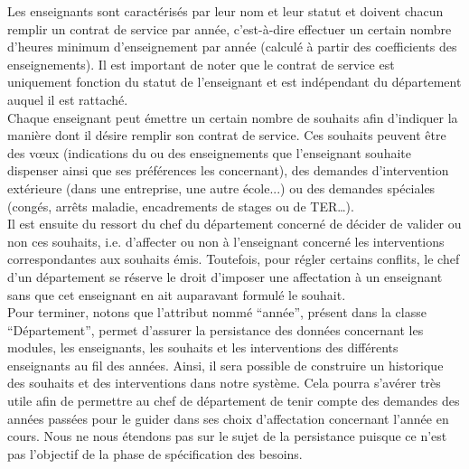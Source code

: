  Les enseignants sont caractérisés par leur nom et leur statut et doivent chacun remplir un contrat de service par année, c'est-à-dire effectuer un certain nombre d'heures minimum d'enseignement par année (calculé à partir des coefficients des enseignements). Il est important de noter que le contrat de service est uniquement fonction du statut de l'enseignant et est indépendant du département auquel il est rattaché.\\

 Chaque enseignant peut émettre un certain nombre de souhaits afin d'indiquer la manière dont il désire remplir son contrat de service. Ces souhaits peuvent être des v\oe ux (indications du ou des enseignements que l'enseignant souhaite dispenser ainsi que ses préférences les concernant), des demandes d'intervention extérieure (dans une entreprise, une autre école...) ou des demandes spéciales (congés, arrêts maladie, encadrements de stages ou de TER\dots).\\ 

 Il est ensuite du ressort du chef du département concerné de décider de valider ou non ces souhaits, i.e. d'affecter ou non à l'enseignant concerné les interventions correspondantes aux souhaits émis. Toutefois, pour régler certains conflits, le chef d'un département se réserve le droit d'imposer une affectation à un enseignant sans que cet enseignant en ait auparavant formulé le souhait.\\ 

 Pour terminer, notons que l'attribut nommé ``année'', présent dans la classe ``Département'', permet d'assurer la persistance des données concernant les modules, les enseignants, les souhaits et les interventions des différents enseignants au fil des années. Ainsi, il sera possible de construire un historique des souhaits et des interventions dans notre système. Cela pourra s'avérer très utile afin de permettre au chef de département de tenir compte des demandes des années passées pour le guider dans ses choix d'affectation concernant l'année en cours. Nous ne nous étendons pas sur le sujet de la persistance puisque ce n'est pas l'objectif de la phase de spécification des besoins. 




